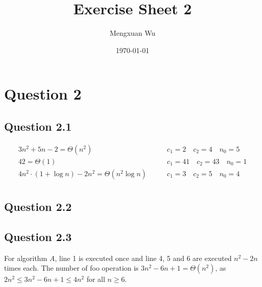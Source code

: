\documentclass{article}
\title{Exercise Sheet 2}
\author{Mengxuan Wu}
\date{\today}
\begin{document}
\maketitle

\section*{Question 2}
\subsection*{Question 2.1}
\begin{align*}
3n^2 + 5n - 2 = \Theta (n^2) \qquad &c_1 = 2 \quad c_2 = 4 \quad n_0 = 5\\
42 = \Theta (1) \qquad &c_1 = 41 \quad c_2 = 43 \quad n_0 = 1\\ 
4n^2\cdot(1+\log n)-2n^2 = \Theta (n^2\log n) \qquad &c_1 = 3 \quad c_2 = 5 \quad n_0 = 4\\
\end{align*}

\subsection*{Question 2.2}
\begin{center}
\end{center}

\subsection*{Question 2.3}
For algorithm $A$, line 1 is executed once and line 4, 5 and 6 are executed $n^2-2n$ times each.
The number of foo operation is $3n^2-6n+1=\Theta(n^2)$, as $2n^2 \leq 3n^2-6n+1 \leq 4n^2$ for all $n \geq 6$.
\end{document}
